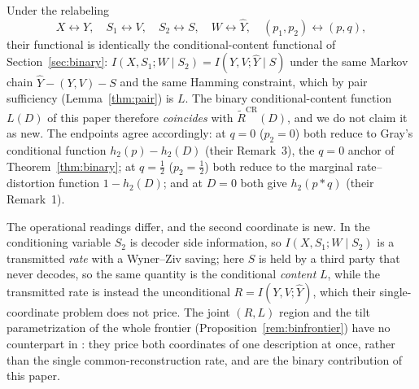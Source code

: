 \documentclass[11pt,onecolumn]{IEEEtran}
\newcommand{\hY}{\widehat{Y}}
\begin{document}
Under the relabeling
\[
  X\leftrightarrow Y,\quad S_1\leftrightarrow V,\quad S_2\leftrightarrow S,\quad
  W\leftrightarrow\hY,\quad (p_1,p_2)\leftrightarrow(p,q),
\]
their functional is identically the conditional-content functional of
Section~\ref{sec:binary}: $I(X,S_1;W\mid S_2)=I(Y,V;\hY\mid S)$ under the same
Markov chain $\hY-(Y,V)-S$ and the same Hamming constraint, which by pair
sufficiency (Lemma~\ref{thm:pair}) is $L$. The binary conditional-content
function $L(D)$ of this paper therefore \emph{coincides} with
$\widetilde R^{\mathrm{CR}}(D)$, and we do not claim it as new. The endpoints
agree accordingly: at $q=0$ ($p_2=0$) both reduce to Gray's conditional function
$h_2(p)-h_2(D)$ (their Remark~3), the $q=0$ anchor of Theorem~\ref{thm:binary}; at
$q=\tfrac12$ ($p_2=\tfrac12$) both reduce to the marginal rate--distortion
function $1-h_2(D)$; and at $D=0$ both give $h_2(p*q)$ (their Remark~1).

The operational readings differ, and the second coordinate is new. In
\cite{lu2016lossy} the conditioning variable $S_2$ is decoder side information,
so $I(X,S_1;W\mid S_2)$ is a transmitted \emph{rate} with a Wyner--Ziv saving;
here $S$ is held by a third party that never decodes, so the same quantity is
the conditional \emph{content} $L$, while the transmitted rate is instead the
unconditional $R=I(Y,V;\hY)$, which their single-coordinate problem does not
price. The joint $(R,L)$ region and the tilt parametrization of the whole
frontier (Proposition~\ref{rem:binfrontier}) have no counterpart in
\cite{lu2016lossy}: they price both coordinates of one description at once,
rather than the single common-reconstruction rate, and are the binary
contribution of this paper.
\end{document}
